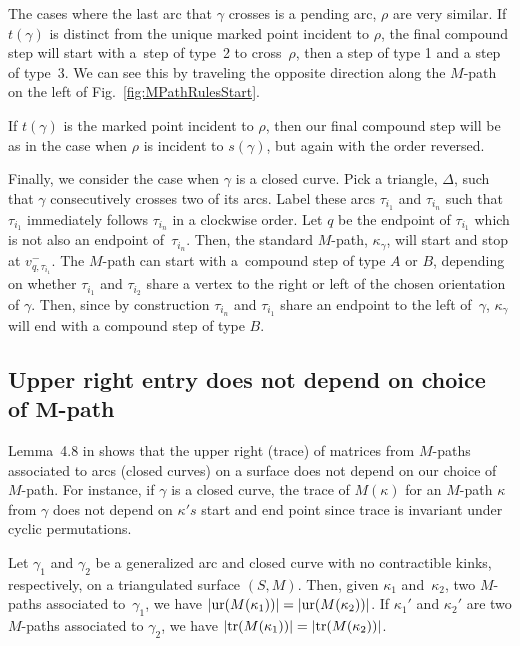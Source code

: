 The cases where the last arc that $\gamma$ crosses is a pending arc, $\rho$ are very similar. If $t(\gamma)$ is distinct from the unique marked point incident to $\rho$, the final compound step will start with a~step of type~2 to cross~$\rho$, then a step of type 1 and a step of type~3. We can see this by traveling the opposite direction along the $M$-path on the left of Fig.~\ref{fig:MPathRulesStart}.

If $t(\gamma)$ is the marked point incident to $\rho$, then our final compound step will be as in the case when $\rho$ is incident to $s(\gamma)$, but again with the order reversed.

Finally, we consider the case when $\gamma$ is a closed curve. Pick a triangle, $\Delta$, such that $\gamma$ consecutively crosses two of its arcs. Label these arcs $\tau_{i_1}$ and $\tau_{i_n}$ such that $\tau_{i_1}$ immediately follows $\tau_{i_n}$ in a clockwise order. Let $q$ be the endpoint of $\tau_{i_1}$ which is not also an endpoint of~$\tau_{i_n}$. Then, the standard $M$-path, $\kappa_\gamma$, will start and stop at $v_{q, \tau_{i_1}}^-$. The $M$-path can start with a~compound step of type $A$ or $B$, depending on whether $\tau_{i_1}$ and $\tau_{i_2}$ share a vertex to the right or left of the chosen orientation of $\gamma$. Then, since by construction $\tau_{i_n}$ and $\tau_{i_1}$ share an endpoint to the left of~$\gamma$, $\kappa_\gamma$ will end with a compound step of type $B$.

\subsection[Upper right entry does not depend on choice of $M$-path]{Upper right entry does not depend on choice of $\boldsymbol{M}$-path}

Lemma~4.8 in \cite{MW} shows that the upper right (trace) of matrices from $M$-paths associated to arcs (closed curves) on a surface does not depend on our choice of $M$-path. For instance, if $\gamma$ is a closed curve, the trace of $M(\kappa)$ for an $M$-path $\kappa$ from $\gamma$ does not depend on $\kappa's$ start and end point since trace is invariant under cyclic permutations.

\begin{Lemma}[{\cite[Lemma 4.8]{MW}}]\label{lem:MWMPathDontCare}
Let $\gamma_1$ and $\gamma_2$ be a generalized arc and closed curve with no contractible kinks, respectively, on a triangulated surface $(S,M)$. Then, given $\kappa_1$ and~$\kappa_2$, two $M$-paths associated to~$\gamma_1$, we have $\vert {\rm ur}(M(\kappa_1)) \vert = \vert {\rm ur}(M(\kappa_2))\vert $. If $\kappa_1'$ and $\kappa_2'$ are two $M$-paths associated to $\gamma_2$, we have $\vert {\rm tr}(M(\kappa_1)) \vert = \vert {\rm tr}(M(\kappa_2)) \vert$.
\end{Lemma}

